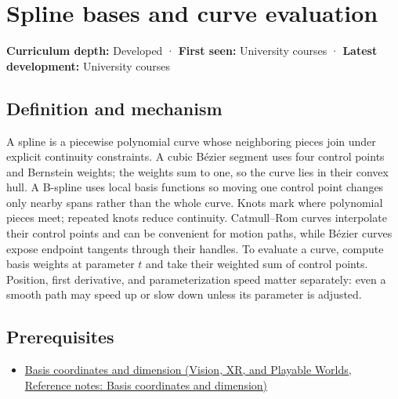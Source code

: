 \hypertarget{appendix-f28eeec97a3d}{}\label{referencestart:appendix-f28eeec97a3d}
\section{Spline bases and curve evaluation}\label{appendix-f28eeec97a3d-spline-bases-and-curve-evaluation}

\hypertarget{appendix-f28eeec97a3d-spline-bases-and-curve-evaluation}{}

\textbf{Curriculum depth:} Developed · \textbf{First seen:} University courses · \textbf{Latest development:} University courses

\begin{allmightroledefinition}

\subsection{Definition and mechanism}\label{appendix-f28eeec97a3d-definition-and-mechanism}

\hypertarget{appendix-f28eeec97a3d-definition-and-mechanism}{}

A spline is a piecewise polynomial curve whose neighboring pieces join under explicit continuity constraints. A cubic Bézier segment uses four control points and Bernstein weights; the weights sum to one, so the curve lies in their convex hull. A B-spline uses local basis functions so moving one control point changes only nearby spans rather than the whole curve. Knots mark where polynomial pieces meet; repeated knots reduce continuity. Catmull--Rom curves interpolate their control points and can be convenient for motion paths, while Bézier curves expose endpoint tangents through their handles. To evaluate a curve, compute basis weights at parameter \(t\) and take their weighted sum of control points. Position, first derivative, and parameterization speed matter separately: even a smooth path may speed up or slow down unless its parameter is adjusted.

\end{allmightroledefinition}

\subsection{Prerequisites}\label{appendix-f28eeec97a3d-prerequisites}

\hypertarget{appendix-f28eeec97a3d-prerequisites}{}

\begin{itemize}
\tightlist
\item
  \href{../07-Vision-XR-and-Playable-Worlds/main.pdf\#nameddest=appendix-ce0341f7ea0d}{Basis coordinates and dimension (Vision, XR, and Playable Worlds, Reference notes: Basis coordinates and dimension)}
\end{itemize}

